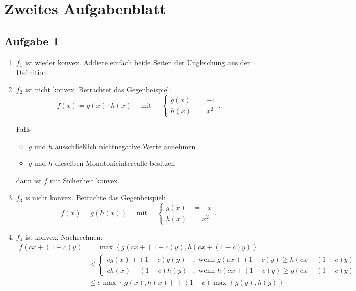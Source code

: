 
\section*{Zweites Aufgabenblatt}
\subsection*{Aufgabe 1}
\label{sec:Aufgabe 1}

\begin{enumerate}[label=(\alph{enumi})]
	\item $f_{1}$ ist wieder konvex. Addiere einfach beide Seiten der Ungleichung aus der Definition.
	\item $f_2$ ist nicht konvex. Betrachtet das Gegenbeispiel:
		\[
			f(x) = g(x) \cdot h(x) \quad \text{ mit } \quad 
			\left\{
			\begin{array}{rl}
			g(x) &= -1 \\
			h(x) &= x^2
			\end{array}
			\right.
		.\] 

		Falls \begin{itemize}
			\item $g$ und $h$ ausschließlich nichtnegative Werte annehmen
			\item $g$ und $h$ dieselben Monotonieintervalle besitzen
		\end{itemize}
		dann ist $f$ mit Sicherheit konvex.
	\item $f_3$ is nicht konvex. Betrachte das Gegenbeispiel:
		\[
			f(x) = g(h(x)) \quad \text{ mit } \quad 
			\left\{
			\begin{array}{rl}
				g(x) &= -x \\
				h(x) &= x^2
			\end{array}
			\right.
		.\] 
	\item $f_4$ ist konvex. Nachrechnen:
		\begin{align*}
			f(cx + (1-c)y) &= \max\limits_{}\left\{ g(cx + (1-c)y), h(cx + (1-c)y) \right\}  \\
						   &\leq \left\{
						   \begin{array}{rl}
							   cg(x) + (1-c)g(y) &,\text{ wenn } g(cx+(1-c)y) \geq h(cx + (1-c)y) \\
							   ch(x) + (1-c)h(y) &,\text{ wenn } h(cx+(1-c)y) \geq g(cx + (1-c)y)
						   \end{array} \right. \\
						   &\leq c \max\limits_{} \left\{ g(x), h(x) \right\} + (1-c) \max\limits_{} \left\{  g(y), h(y)\right\} 
		\end{align*}
\end{enumerate}

